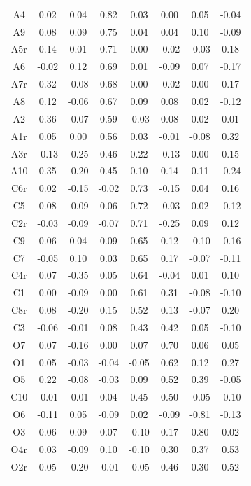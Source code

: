 \documentclass[
  english,
  man, fleqn, noextraspace]{apa6}
\begin{document}
\begin{table}[tbp]
\begin{center}
\begin{threeparttable}
{\begin{tabular}{cccccccc}
A4 & 0.02 & 0.04 & 0.82 & 0.03 & 0.00 & 0.05 & -0.04\\
A9 & 0.08 & 0.09 & 0.75 & 0.04 & 0.04 & 0.10 & -0.09\\
A5r & 0.14 & 0.01 & 0.71 & 0.00 & -0.02 & -0.03 & 0.18\\
A6 & -0.02 & 0.12 & 0.69 & 0.01 & -0.09 & 0.07 & -0.17\\
A7r & 0.32 & -0.08 & 0.68 & 0.00 & -0.02 & 0.00 & 0.17\\
A8 & 0.12 & -0.06 & 0.67 & 0.09 & 0.08 & 0.02 & -0.12\\
A2 & 0.36 & -0.07 & 0.59 & -0.03 & 0.08 & 0.02 & 0.01\\
A1r & 0.05 & 0.00 & 0.56 & 0.03 & -0.01 & -0.08 & 0.32\\
A3r & -0.13 & -0.25 & 0.46 & 0.22 & -0.13 & 0.00 & 0.15\\
A10 & 0.35 & -0.20 & 0.45 & 0.10 & 0.14 & 0.11 & -0.24\\
C6r & 0.02 & -0.15 & -0.02 & 0.73 & -0.15 & 0.04 & 0.16\\
C5 & 0.08 & -0.09 & 0.06 & 0.72 & -0.03 & 0.02 & -0.12\\
C2r & -0.03 & -0.09 & -0.07 & 0.71 & -0.25 & 0.09 & 0.12\\
C9 & 0.06 & 0.04 & 0.09 & 0.65 & 0.12 & -0.10 & -0.16\\
C7 & -0.05 & 0.10 & 0.03 & 0.65 & 0.17 & -0.07 & -0.11\\
C4r & 0.07 & -0.35 & 0.05 & 0.64 & -0.04 & 0.01 & 0.10\\
C1 & 0.00 & -0.09 & 0.00 & 0.61 & 0.31 & -0.08 & -0.10\\
C8r & 0.08 & -0.20 & 0.15 & 0.52 & 0.13 & -0.07 & 0.20\\
C3 & -0.06 & -0.01 & 0.08 & 0.43 & 0.42 & 0.05 & -0.10\\
O7 & 0.07 & -0.16 & 0.00 & 0.07 & 0.70 & 0.06 & 0.05\\
O1 & 0.05 & -0.03 & -0.04 & -0.05 & 0.62 & 0.12 & 0.27\\
O5 & 0.22 & -0.08 & -0.03 & 0.09 & 0.52 & 0.39 & -0.05\\
C10 & -0.01 & -0.01 & 0.04 & 0.45 & 0.50 & -0.05 & -0.10\\
O6 & -0.11 & 0.05 & -0.09 & 0.02 & -0.09 & -0.81 & -0.13\\
O3 & 0.06 & 0.09 & 0.07 & -0.10 & 0.17 & 0.80 & 0.02\\
O4r & 0.03 & -0.09 & 0.10 & -0.10 & 0.30 & 0.37 & 0.53\\
O2r & 0.05 & -0.20 & -0.01 & -0.05 & 0.46 & 0.30 & 0.52\\
\bottomrule
\addlinespace
\end{tabular}

}
\end{threeparttable}
\end{center}
\end{table}
\end{document}
